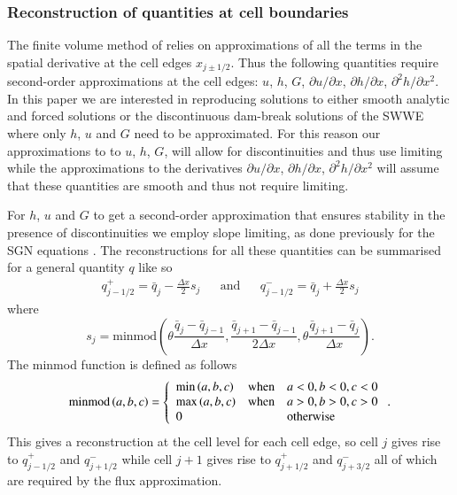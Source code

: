 \documentclass[10pt]{elsarticle}
\begin{document}
\subsubsection{Reconstruction of quantities at cell boundaries}
The finite volume method of \citet{Kurganov-etal-2001-707} relies on approximations of all the terms in the spatial derivative at the cell edges $x_{j\pm1/2}$. Thus the following quantities require second-order approximations at the cell edges: $u$, $h$, $G$, $\partial u / \partial x$, $\partial h / \partial x$, $\partial^2 h / \partial x^2$. In this paper we are interested in reproducing solutions to either smooth analytic and forced solutions or the discontinuous dam-break solutions of the SWWE where only $h$, $u$ and $G$ need to be approximated. For this reason our approximations to to  $u$, $h$, $G$, will allow for discontinuities and thus use limiting while the approximations to the derivatives $\partial u / \partial x$, $\partial h / \partial x$, $\partial^2 h / \partial x^2$ will assume that these quantities are smooth and thus not require limiting.

For $h$, $u$ and $G$ to get a second-order approximation that ensures stability in the presence of discontinuities we employ slope limiting, as done previously for the SGN equations \cite{Zoppou-etal-2017}. The reconstructions for all these quantities can be summarised for a general quantity $q$ like so
\begin{align}
q^+_{j-1/2} = \bar{q}_j - \frac{\Delta x}{2} s_j & & \text{and} & &
q^-_{j-1/2} = \bar{q}_j + \frac{\Delta x}{2} s_j
\end{align}
where
\begin{equation}
s_j = \text{minmod}\left(\theta \dfrac{\bar{q}_j - \bar{q}_{j-1}}{\Delta x},  \dfrac{\bar{q}_{j+1} - \bar{q}_{j-1}}{2\Delta x},\theta \dfrac{\bar{q}_{j+1} - \bar{q}_{j}}{\Delta x}\right).
\end{equation}
The minmod function is defined as follows
\begin{equation}
\text{minmod}\left(a,b,c\right) = \left\lbrace \begin{array}{l c l}
\min{\left(a,b,c\right)} & \text{when} & a<0, b<0, c<0 \\
\max{\left(a,b,c\right)} & \text{when} & a>0, b>0, c>0 \\
0 & & \text{otherwise}
\end{array} \right. . 
\end{equation}
This gives a reconstruction at the cell level for each cell edge, so cell $j$ gives rise to $q^+_{j-1/2}$ and $q^-_{j+1/2} $ while cell $j+1$ gives rise to $q^+_{j+1/2}$ and $q^-_{j+3/2}$ all of which are required by the flux approximation.
\end{document}
